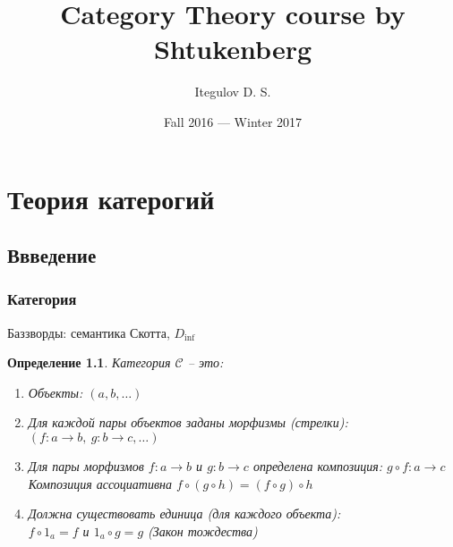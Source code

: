 \documentclass[a4paper, fleqn, draft]{report}
\author{Itegulov D. S.}
\title{Category Theory course by Shtukenberg}
\date{Fall 2016 --- Winter 2017}
\newtheorem*{defn}{Определение}
\begin{document}
\maketitle
\tableofcontents
\newpage
\chapter{Теория катерогий}
\section{Ввведение}
\subsection{Категория}
Баззворды: семантика Скотта, $D_{\inf}$
\begin{defn}
Категория $\mathcal{C}$ -- это:
\begin{enumerate}
\item Объекты: $(a, b, \ldots)$
\item Для каждой пары объектов заданы морфизмы (стрелки):
  $(f \colon a \to b,\ g \colon b \to c, \ldots)$
\item Для пары морфизмов $f \colon a \to b$ и $g \colon b \to c$
      определена композиция: $g \circ f\colon a \to c$ \\
      Композиция ассоциативна $f \circ (g \circ h) = (f \circ g) \circ h$
\item Должна существовать единица (для каждого объекта): \\
      $f \circ 1_a = f$ и $1_a \circ g = g$ (Закон тождества)
\end{enumerate}
\end{defn}
\end{document}
